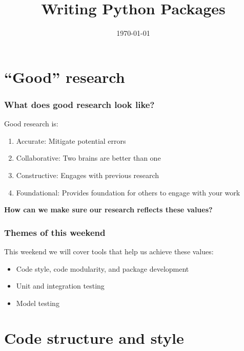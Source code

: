 \documentclass[10pt]{beamer}
\title{Writing Python Packages}
\date[]{\today}
\begin{document}
\begin{frame}
  \titlepage
\end{frame}

\section{``Good'' research}

  \begin{frame} \frametitle{What does good research look like?}

    Good research is:

    \begin{enumerate}
      \item<2-> Accurate: Mitigate potential errors
      \item<3-> Collaborative: Two brains are better than one
      \item<4-> Constructive: Engages with previous research
      \item<5-> Foundational: Provides foundation for others to engage with your work
    \end{enumerate}

    \vspace{0.25cm}

    \textbf{How can we make sure our research reflects these values?}

  \end{frame}

  \begin{frame} \frametitle{Themes of this weekend}

    This weekend we will cover tools that help us achieve these values:

    \begin{itemize}
      \item Code style, code modularity, and package development
      \item Unit and integration testing
      \item Model testing
    \end{itemize}

  \end{frame}


\section{Code structure and style}
\end{document}
